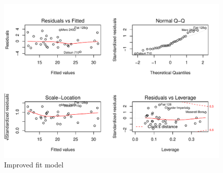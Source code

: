 \documentclass[a4paper, 11pt]{article}\usepackage[]{graphicx}\usepackage[]{color}
\makeatletter
\def\maxwidth{ %
  \ifdim\Gin@nat@width>\linewidth
    \linewidth
  \else
    \Gin@nat@width
  \fi
}
\newenvironment{knitrout}{}{} %
\makeatother
\begin{document}
\begin{knitrout}
\color{fgcolor}\begin{figure}
\includegraphics[width=\maxwidth]{figure/noInter-1} \caption[Improved fit model]{Improved fit model}\label{fig:noInter}
\end{figure}


\end{knitrout}
\end{document}
